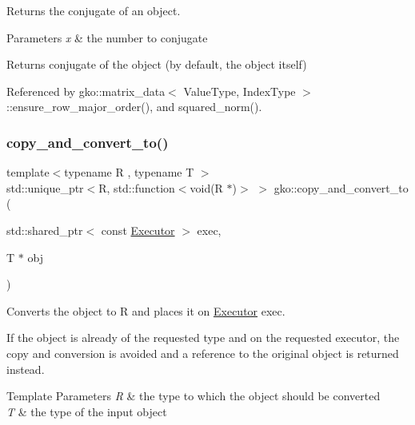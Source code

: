 Returns the conjugate of an object. 


\begin{DoxyParams}{Parameters}
{\em x} & the number to conjugate\\
\hline
\end{DoxyParams}
\begin{DoxyReturn}{Returns}
conjugate of the object (by default, the object itself) 
\end{DoxyReturn}


Referenced by gko\+::matrix\+\_\+data$<$ Value\+Type, Index\+Type $>$\+::ensure\+\_\+row\+\_\+major\+\_\+order(), and squared\+\_\+norm().

\mbox{\label{namespacegko_ac5cef6e5e9e02b8d77ce01be41117cc0}} 
\subsubsection{\texorpdfstring{copy\+\_\+and\+\_\+convert\+\_\+to()}{copy\_and\_convert\_to()}\hspace{0.1cm}{\footnotesize\ttfamily [1/2]}}
{\footnotesize\ttfamily template$<$typename R , typename T $>$ \\
std\+::unique\+\_\+ptr$<$R, std\+::function$<$void(R $\ast$)$>$ $>$ gko\+::copy\+\_\+and\+\_\+convert\+\_\+to (\begin{DoxyParamCaption}\item[{std\+::shared\+\_\+ptr$<$ const \hyperlink{classgko_1_1Executor}{Executor} $>$}]{exec,  }\item[{T $\ast$}]{obj }\end{DoxyParamCaption})}



Converts the object to R and places it on \hyperlink{classgko_1_1Executor}{Executor} exec. 

If the object is already of the requested type and on the requested executor, the copy and conversion is avoided and a reference to the original object is returned instead.


\begin{DoxyTemplParams}{Template Parameters}
{\em R} & the type to which the object should be converted \\
\hline
{\em T} & the type of the input object\\
\hline
\end{DoxyTemplParams}

